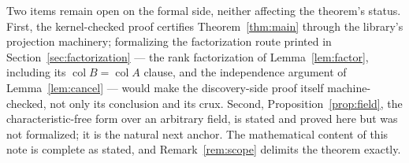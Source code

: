 \documentclass[11pt]{article}
\begin{document}
Two items remain open on the formal side, neither affecting the theorem's status.
First, the kernel-checked proof certifies Theorem~\ref{thm:main} through the library's
projection machinery; formalizing the factorization route printed in
Section~\ref{sec:factorization} --- the rank factorization of
Lemma~\ref{lem:factor}, including its
$\operatorname{col} B = \operatorname{col} A$ clause, and the independence argument
of Lemma~\ref{lem:cancel} --- would
make the discovery-side proof itself machine-checked, not only its conclusion and its
crux. Second, Proposition~\ref{prop:field}, the characteristic-free form over an
arbitrary field, is stated and proved here but was not formalized; it is the natural
next anchor. The mathematical content of this note is complete as stated, and
Remark~\ref{rem:scope} delimits the theorem exactly.
\end{document}
